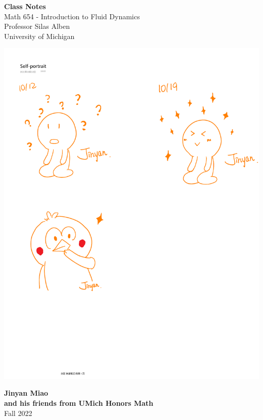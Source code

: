 \documentclass[11pt]{book}
\theoremstyle{break}
\theoremstyle{break}
\begin{document}
	\begin{titlepage}
		\begin{center}
			\vspace*{1cm}
			\Huge \color{red}
				\textbf{Class Notes}\\
			\vspace{0.5cm}			
			\Large \color{black}
				Math 654 - Introduction to Fluid Dynamics\\
				Professor Silas Alben\\	
				University of Michigan\\
			\vspace{2cm}

			\includegraphics[scale=0.95]{hmm.pdf}
			
			
			\vspace{4cm}
			\LARGE
				\textbf{Jinyan Miao}\\
				\large \textbf{and his friends from UMich Honors Math}\\
				\hfill\break
				\LARGE Fall 2022\\
			\vspace{1cm}

		\vspace*{\fill}
		\end{center}			
	\end{titlepage}
\end{document}
